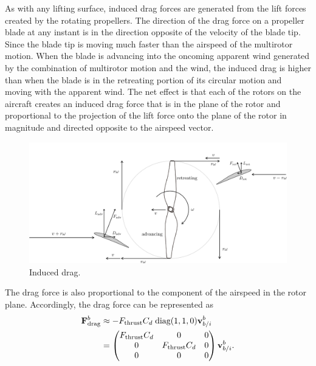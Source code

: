 As with any lifting surface, induced drag forces are generated from the lift forces created by the rotating propellers. The direction of the drag force on a propeller blade at any instant is in the direction opposite of the velocity of the blade tip. Since the blade tip is moving much faster than the airspeed of the multirotor motion. When the blade is advancing into the oncoming apparent wind generated by the combination of multirotor motion and the wind, the induced drag is higher than when the blade is in the retreating portion of its circular motion and moving with the apparent wind. The net effect is that each of the rotors on the aircraft creates an induced drag force that is in the plane of the rotor and proportional to the projection of the lift force onto the plane of the rotor in magnitude and directed opposite to the airspeed vector. 
%
\begin{figure}[hhhhtb]
\begin{center}
\includegraphics[width=6.5in]{chap3_multirotor/figures/eom-induced-drag2}
\end{center}
\caption{Induced drag.} \label{fig:eom-induced-drag}
\end{figure}
%
%
The drag force is also proportional to the component of the airspeed in the rotor plane.\cite{MahonyKC12} Accordingly, the drag force can be represented as 
\begin{align*}
	\mathbf{F}_\text{drag}^b &\approx - F_\text{thrust} C_d \; \text{diag}(1,1,0) \mathbf{v}_{b/i}^b \\
	&= \begin{pmatrix} F_\text{thrust}C_d & 0 & 0 \\ 0 & F_\text{thrust}C_d & 0 \\ 0 & 0 & 0 \end{pmatrix}\mathbf{v}_{b/i}^b.
\end{align*}
